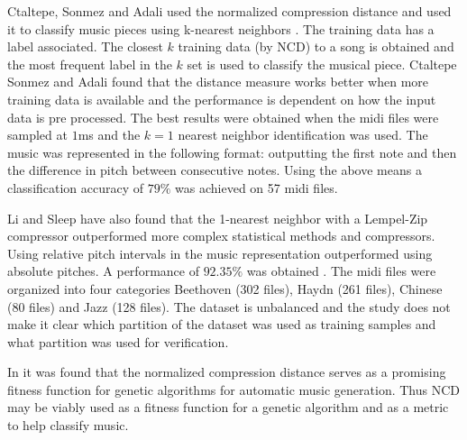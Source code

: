 Ctaltepe, Sonmez and Adali used the normalized compression distance and used it to classify music pieces using k-nearest neighbors \cite{Cataltepe2005}. 
The training data has a label associated. The closest $k$ training data (by \ac{NCD}) to a song is obtained and the most frequent label in the $k$ set is used to classify the musical piece. 
Ctaltepe Sonmez and Adali found that the distance measure works better when more training data is available and the performance is dependent on how the input data is pre processed. 
The best results were obtained when the midi files were sampled at $1$ms and the $k=1$ nearest neighbor identification was used. 
The music was represented in the following format: outputting the first note and then the difference in pitch between consecutive notes. Using the above means a classification accuracy of $79\%$ was achieved on 57 midi files.

Li and Sleep have also found that the 1-nearest neighbor with a Lempel-Zip compressor outperformed more complex statistical methods and compressors. Using relative pitch intervals in the music representation outperformed using absolute pitches. A performance of $92.35\%$ was obtained \cite{Ling2004}.
The midi files were organized into four categories Beethoven (302 files), Haydn (261 files), Chinese (80 files) and Jazz (128 files). The dataset is unbalanced and the study does not make it clear which partition of the dataset was used as training samples and what partition was used for verification.

In \cite{Alfonseca2007, Alfonseca:2005:ECM:1981094.1981161, Ling2004,Alfonseca2006} it was found that the normalized compression distance serves as a promising fitness function for genetic algorithms for automatic music generation. Thus \ac{NCD} may be viably used as a fitness function for a genetic algorithm and as a metric to help classify music.

